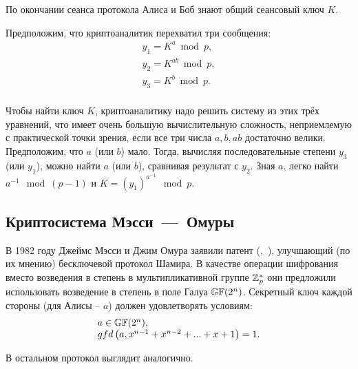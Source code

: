 По окончании сеанса протокола Алиса и Боб знают общий сеансовый ключ $K$.

Предположим, что криптоаналитик перехватил три сообщения:
\[ \begin{array}{l}
    y_1 = K^a \bmod p, \\
    y_2 = K^{ab} \bmod p, \\
    y_3 = K^b \bmod p. \\
\end{array} \]

Чтобы найти ключ $K$, криптоаналитику надо решить систему из этих трёх уравнений, что имеет очень большую вычислительную сложность, неприемлемую с практической точки зрения, если все три числа $a, b, ab$ достаточно велики. Предположим, что $a$ (или $b$) мало. Тогда, вычисляя последовательные степени $y_3$ (или $y_1$), можно найти $a$ (или $b$), сравнивая результат с $y_2$. Зная $a$, легко найти $a^{-1}\mod(p-1)$ и $K=(y_1)^{a^{-1}}\mod p$.


\subsection{Криптосистема Мэсси~---~Омуры}

В 1982 году Джеймс Мэсси и Джим Омура заявили патент (,~\cite{Massey:Omura:1986}), улучшающий (по их мнению) бесключевой протокол Шамира. В качестве операции шифрования вместо возведения в степень в мультипликативной группе $\mathbb{Z}_p^*$ они предложили использовать возведение в степень в поле Галуа $\mathbb{GF}(2^n)$. Секретный ключ каждой стороны (для Алисы -- $a$) должен удовлетворять условиям:
\[ \begin{array}{l}
 a \in \mathbb{GF}(2^n), \\
 gfd \left( a, x^{ n-1 } + x^{ n-2 } + ... + x + 1 \right) = 1. \\
\end{array} \]

В остальном протокол выглядит аналогично.

